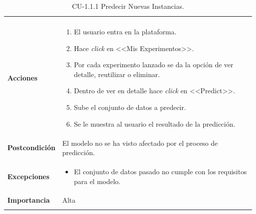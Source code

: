 \begin{longtable}[H]{@{}ll@{}}
\begin{minipage}[t]{0.71\columnwidth}
\begin{itemize}
\end{itemize}\strut
\end{minipage}\tabularnewline
\begin{minipage}[t]{0.23\columnwidth}\raggedright\strut
\textbf{Acciones}\strut
\end{minipage} & \begin{minipage}[t]{0.71\columnwidth}\raggedright\strut
\begin{enumerate}
\def\labelenumi{\arabic{enumi}.}
\tightlist
\item El usuario entra en la plataforma.
\item Hace \textit{click} en <<Mis Experimentos>>.
\item Por cada experimento lanzado se da la opción de ver detalle, reutilizar o eliminar.
\item Dentro de ver en detalle hace \textit{click} en <<Predict>>.
\item Sube el conjunto de datos a predecir.
\item Se le muestra al usuario el resultado de la predicción.
\end{enumerate}\strut
\end{minipage}\tabularnewline
\begin{minipage}[t]{0.23\columnwidth}\raggedright\strut
\textbf{Postcondición}\strut
\end{minipage} & \begin{minipage}[t]{0.71\columnwidth}\raggedright\strut
El modelo no se ha visto afectado por el proceso de predicción.\strut
\end{minipage}\tabularnewline
\begin{minipage}[t]{0.23\columnwidth}\raggedright\strut
\textbf{Excepciones}\strut
\end{minipage} & \begin{minipage}[t]{0.71\columnwidth}\raggedright\strut
\begin{itemize}
\tightlist
\item El conjunto de datos pasado no cumple con los requisitos para el modelo.
\end{itemize}\strut
\end{minipage}\tabularnewline
\begin{minipage}[t]{0.23\columnwidth}\raggedright\strut
\textbf{Importancia}\strut
\end{minipage} & \begin{minipage}[t]{0.71\columnwidth}\raggedright\strut
Alta\strut
\end{minipage}\tabularnewline
\bottomrule
\caption{CU-1.1.1 Predecir Nuevas Instancias.}
\end{longtable}

